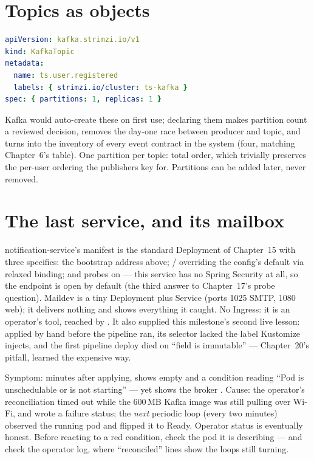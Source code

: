 \section{Topics as objects}

\begin{lstlisting}[language=yaml]
apiVersion: kafka.strimzi.io/v1
kind: KafkaTopic
metadata:
  name: ts.user.registered
  labels: { strimzi.io/cluster: ts-kafka }
spec: { partitions: 1, replicas: 1 }
\end{lstlisting}

Kafka would auto-create these on first use; declaring them makes
partition count a reviewed decision, removes the day-one race between
producer and topic, and turns  into the
inventory of every event contract in the system (four, matching
Chapter~6's table). One partition per topic: total order, which
trivially preserves the per-user ordering the publishers key for.
Partitions can be added later, never removed.

\section{The last service, and its mailbox}

notification-service's manifest is the standard Deployment of
Chapter~15 with three specifics: the bootstrap address above;
 /  overriding the
config's  default via relaxed binding;
and probes on  --- this service has no Spring
Security at all, so the endpoint is open by default (the third answer
to Chapter~17's probe question). Maildev is a tiny Deployment plus
Service (ports 1025 SMTP, 1080 web); it delivers nothing and shows
everything it caught. No Ingress: it is an operator's tool, reached by
. It also supplied this milestone's second live
lesson: applied by hand before the pipeline ran, its selector lacked
the label Kustomize injects, and the first pipeline deploy died on
``field is immutable'' --- Chapter~20's pitfall, learned the
expensive way.

\begin{pitfall}
Symptom: minutes after applying,  shows
 empty and a condition reading ``Pod is unschedulable or is
not starting'' --- yet  shows the broker . Cause: the operator's reconciliation timed out while the
600\,MB Kafka image was still pulling over Wi-Fi, and wrote a failure
status; the \emph{next} periodic loop (every two minutes) observed the
running pod and flipped it to Ready. Operator status is eventually
honest. Before reacting to a red condition, check the pod it is
describing --- and check the operator log, where
``reconciled'' lines show the loops still turning.
\end{pitfall}

